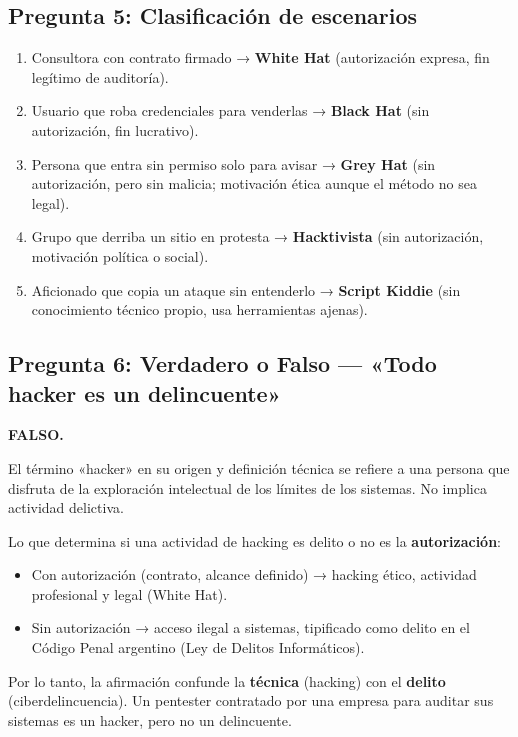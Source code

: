 \documentclass[11pt,a4paper]{article}
\begin{document}
\subsection*{Pregunta 5: Clasificación de escenarios}
\begin{respuesta}
\begin{enumerate}[leftmargin=*]
  \item Consultora con contrato firmado → \textbf{White Hat} (autorización expresa, fin legítimo de auditoría).
  \item Usuario que roba credenciales para venderlas → \textbf{Black Hat} (sin autorización, fin lucrativo).
  \item Persona que entra sin permiso solo para avisar → \textbf{Grey Hat} (sin autorización, pero sin malicia; motivación ética aunque el método no sea legal).
  \item Grupo que derriba un sitio en protesta → \textbf{Hacktivista} (sin autorización, motivación política o social).
  \item Aficionado que copia un ataque sin entenderlo → \textbf{Script Kiddie} (sin conocimiento técnico propio, usa herramientas ajenas).
\end{enumerate}
\end{respuesta}

\subsection*{Pregunta 6: Verdadero o Falso --- «Todo hacker es un delincuente»}
\begin{respuesta}
\textbf{FALSO.}

El término «hacker» en su origen y definición técnica se refiere a una persona que disfruta de la exploración intelectual de los límites de los sistemas. No implica actividad delictiva.

Lo que determina si una actividad de hacking es delito o no es la \textbf{autorización}:
\begin{itemize}[leftmargin=*]
  \item Con autorización (contrato, alcance definido) → hacking ético, actividad profesional y legal (White Hat).
  \item Sin autorización → acceso ilegal a sistemas, tipificado como delito en el Código Penal argentino (Ley de Delitos Informáticos).
\end{itemize}

Por lo tanto, la afirmación confunde la \textbf{técnica} (hacking) con el \textbf{delito} (ciberdelincuencia). Un pentester contratado por una empresa para auditar sus sistemas es un hacker, pero no un delincuente.
\end{respuesta}
\end{document}
